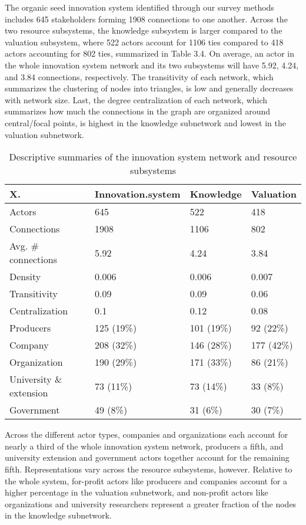 \documentclass[twoside,12pt,final]{ucthesis-CA2012}
\begin{document}
\begin{ucmainmatter}
The organic seed innovation system identified through our survey methods
includes 645 stakeholders forming 1908 connections to one another.
Across the two resource subsystems, the knowledge subsystem is larger
compared to the valuation subsystem, where 522 actors account for 1106
ties compared to 418 actors accounting for 802 ties, summarized in Table
3.4. On average, an actor in the whole innovation system network and its
two subsystems will have 5.92, 4.24, and 3.84 connections, respectively.
The transitivity of each network, which summarizes the clustering of
nodes into triangles, is low and generally decreases with network size.
Last, the degree centralization of each network, which summarizes how
much the connections in the graph are organized around central/focal
points, is highest in the knowledge subnetwork and lowest in the
valuation subnetwork.
\begin{table}

\caption{\label{tab:unnamed-chunk-26}Descriptive summaries of the innovation system network and resource subsystems}
\centering
\begin{tabular}[t]{llll}
\toprule
X. & Innovation.system & Knowledge & Valuation\\
\midrule
Actors & 645 & 522 & 418\\
Connections & 1908 & 1106 & 802\\
Avg. \# connections & 5.92 & 4.24 & 3.84\\
Density & 0.006 & 0.006 & 0.007\\
Transitivity & 0.09 & 0.09 & 0.06\\
\addlinespace
Centralization & 0.1 & 0.12 & 0.08\\
Producers & 125 (19\%) & 101 (19\%) & 92 (22\%)\\
Company & 208 (32\%) & 146 (28\%) & 177 (42\%)\\
Organization & 190 (29\%) & 171 (33\%) & 86 (21\%)\\
University \&
extension & 73 (11\%) & 73 (14\%) & 33 (8\%)\\
\addlinespace
Government & 49 (8\%) & 31 (6\%) & 30 (7\%)\\
\bottomrule
\end{tabular}
\end{table}
Across the different actor types, companies and organizations each
account for nearly a third of the whole innovation system network,
producers a fifth, and university extension and government actors
together account for the remaining fifth. Representations vary across
the resource subsystems, however. Relative to the whole system,
for-profit actors like producers and companies account for a higher
percentage in the valuation subnetwork, and non-profit actors like
organizations and university researchers represent a greater fraction of
the nodes in the knowledge subnetwork.


\end{ucmainmatter}
\end{document}

